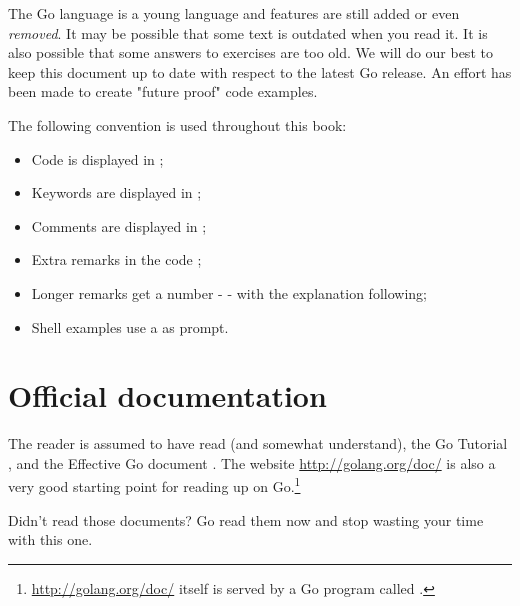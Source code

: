 \begin{lbar}
The Go language is a young language and
features are still added or even \emph{removed}. It 
may be possible that some text is outdated when you
read it. It is also
possible that some answers to exercises are
too old. We will do our best to keep this document up to 
date with respect to the latest Go release.
An effort has been made to create "future proof" code examples.
\end{lbar}
The following convention is used throughout this book:
\begin{itemize}
\item Code is displayed in ;
\item Keywords are displayed in ;
\item Comments are displayed in ;
\item Extra remarks in the code ;
\item Longer remarks get a number -  - with the explanation following;
\item Shell examples use a \pr{} as prompt.
\end{itemize}

\section{Official documentation}
The reader is assumed to have read (and somewhat understand), the
Go Tutorial \cite{go_tutorial}, and the Effective Go
document \cite{effective_go}. The
website \url{http://golang.org/doc/} is also a very good starting point
for reading up on Go.\footnote{\url{http://golang.org/doc/} itself is served by 
a Go program called .}

\begin{lbar}
Didn't read those documents? Go read them now and stop wasting your time
with this one.
\end{lbar}

